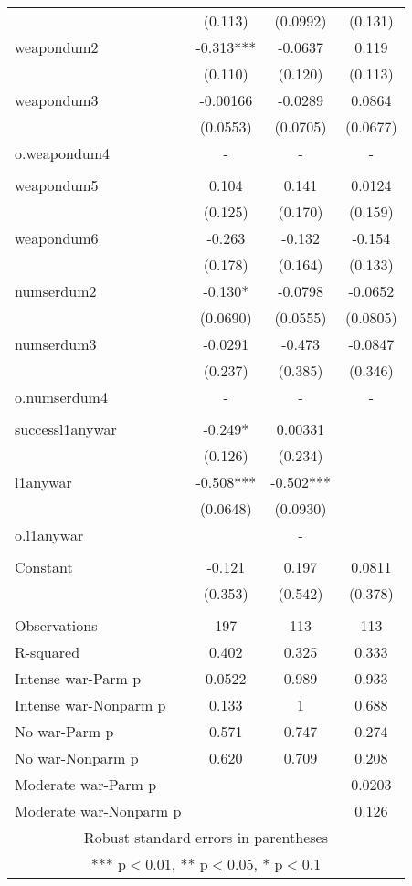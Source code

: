 \documentclass[]{article}
\begin{document}
\begin{tabular}{lccc}
 & (0.113) & (0.0992) & (0.131) \\
weapondum2 & -0.313*** & -0.0637 & 0.119 \\
 & (0.110) & (0.120) & (0.113) \\
weapondum3 & -0.00166 & -0.0289 & 0.0864 \\
 & (0.0553) & (0.0705) & (0.0677) \\
o.weapondum4 & - & - & - \\
 &  &  &  \\
weapondum5 & 0.104 & 0.141 & 0.0124 \\
 & (0.125) & (0.170) & (0.159) \\
weapondum6 & -0.263 & -0.132 & -0.154 \\
 & (0.178) & (0.164) & (0.133) \\
numserdum2 & -0.130* & -0.0798 & -0.0652 \\
 & (0.0690) & (0.0555) & (0.0805) \\
numserdum3 & -0.0291 & -0.473 & -0.0847 \\
 & (0.237) & (0.385) & (0.346) \\
o.numserdum4 & - & - & - \\
 &  &  &  \\
successl1anywar & -0.249* & 0.00331 &  \\
 & (0.126) & (0.234) &  \\
l1anywar & -0.508*** & -0.502*** &  \\
 & (0.0648) & (0.0930) &  \\
o.l1anywar &  & - &  \\
 &  &  &  \\
Constant & -0.121 & 0.197 & 0.0811 \\
 & (0.353) & (0.542) & (0.378) \\
 &  &  &  \\
Observations & 197 & 113 & 113 \\
R-squared & 0.402 & 0.325 & 0.333 \\
Intense war-Parm p & 0.0522 & 0.989 & 0.933 \\
Intense war-Nonparm p & 0.133 & 1 & 0.688 \\
No war-Parm p & 0.571 & 0.747 & 0.274 \\
No war-Nonparm p & 0.620 & 0.709 & 0.208 \\
Moderate war-Parm p &  &  & 0.0203 \\
 Moderate war-Nonparm p &  &  & 0.126 \\ \hline
\multicolumn{4}{c}{ Robust standard errors in parentheses} \\
\multicolumn{4}{c}{ *** p$<$0.01, ** p$<$0.05, * p$<$0.1} \\
\end{tabular}
\end{document}

